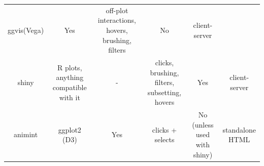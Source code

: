\documentclass[11pt,]{report}
\begin{document}
\begin{longtable}[]{@{}cccccc@{}}
\begin{minipage}[t]{0.11\columnwidth}
ggvis(Vega)\strut
\end{minipage} & \begin{minipage}[t]{0.18\columnwidth}\centering\strut
Yes\strut
\end{minipage} & \begin{minipage}[t]{0.18\columnwidth}\centering\strut
off-plot interactions, hovers, brushing, filters\strut
\end{minipage} & \begin{minipage}[t]{0.17\columnwidth}\centering\strut
No\strut
\end{minipage} & \begin{minipage}[t]{0.09\columnwidth}\centering\strut
client-server\strut
\end{minipage}\tabularnewline
\begin{minipage}[t]{0.10\columnwidth}\centering\strut
shiny\strut
\end{minipage} & \begin{minipage}[t]{0.11\columnwidth}\centering\strut
R plots, anything compatible with it\strut
\end{minipage} & \begin{minipage}[t]{0.18\columnwidth}\centering\strut
-\strut
\end{minipage} & \begin{minipage}[t]{0.18\columnwidth}\centering\strut
clicks, brushing, filters, subsetting, hovers\strut
\end{minipage} & \begin{minipage}[t]{0.17\columnwidth}\centering\strut
Yes\strut
\end{minipage} & \begin{minipage}[t]{0.09\columnwidth}\centering\strut
client-server\strut
\end{minipage}\tabularnewline
\begin{minipage}[t]{0.10\columnwidth}\centering\strut
animint\strut
\end{minipage} & \begin{minipage}[t]{0.11\columnwidth}\centering\strut
ggplot2 (D3)\strut
\end{minipage} & \begin{minipage}[t]{0.18\columnwidth}\centering\strut
Yes\strut
\end{minipage} & \begin{minipage}[t]{0.18\columnwidth}\centering\strut
clicks + selects\strut
\end{minipage} & \begin{minipage}[t]{0.17\columnwidth}\centering\strut
No (unless used with shiny)\strut
\end{minipage} & \begin{minipage}[t]{0.09\columnwidth}\centering\strut
standalone HTML\strut
\end{minipage}\tabularnewline
\bottomrule
\end{longtable}
\end{document}
